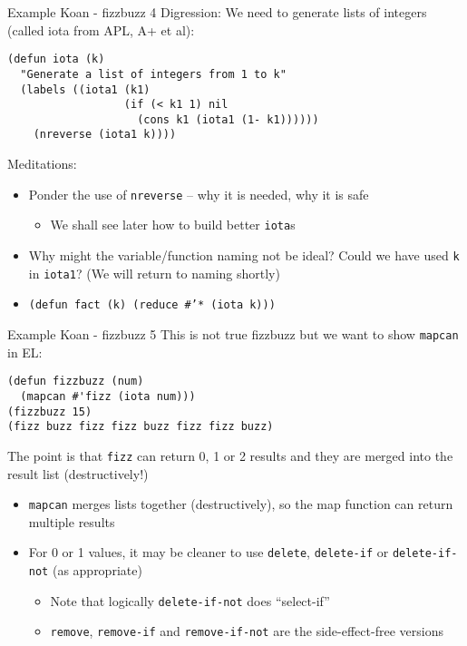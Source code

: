 \documentclass[presentation]{beamer}
\begin{document}
\begin{frame}[fragile]{Example Koan - fizzbuzz 4}
Digression: We need to generate lists of integers (called iota from APL, A+ et al):
\begin{verbatim}
(defun iota (k)
  "Generate a list of integers from 1 to k" 
  (labels ((iota1 (k1)
                  (if (< k1 1) nil
                    (cons k1 (iota1 (1- k1))))))
    (nreverse (iota1 k))))
\end{verbatim}
Meditations:
\begin{itemize}
\item Ponder the use of \texttt{nreverse} -- why it is needed, why it is safe
  \begin{itemize}
  \item We shall see later how to build better \texttt{iota}s
  \end{itemize}
\item Why might the variable/function naming not be ideal?  Could we have used \texttt{k} in \texttt{iota1}?  (We will return to naming shortly)
\item \texttt{(defun fact (k) (reduce \#'* (iota k)))}
\end{itemize}

\end{frame}
\begin{frame}[fragile]{Example Koan - fizzbuzz 5}
This is not true fizzbuzz but we want to show \texttt{mapcan} in EL:
\begin{verbatim}
(defun fizzbuzz (num)
  (mapcan #'fizz (iota num)))
(fizzbuzz 15)
(fizz buzz fizz fizz buzz fizz fizz buzz)
\end{verbatim}
The point is that \texttt{fizz} can return 0, 1 or 2 results and they are merged into the result list (destructively!)
\begin{itemize}
\item \texttt{mapcan} merges lists together (destructively), so the map function can return multiple results
\item For 0 or 1 values, it may be cleaner to use \texttt{delete}, \texttt{delete-if} or \texttt{delete-if-not} (as appropriate)
  \begin{itemize}
  \item Note that logically \texttt{delete-if-not} does ``select-if''
  \item \texttt{remove}, \texttt{remove-if} and \texttt{remove-if-not} are the side-effect-free versions
  \end{itemize}
\end{itemize}
\end{frame}
\end{document}
